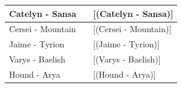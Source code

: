 \documentclass[10pt,a4paper]{article}
\begin{document}
\begin{enumerate}
\begin{table}[H]
\begin{tabular}{|l|l|l|}
		Catelyn - Sansa   &       & {[}(Catelyn - Sansa){]}                                                                                                                                                                                                                                                                                                                                                                                                                                                                              \\ \hline
		Cersei - Mountain &       & {[}(Cersei - Mountain){]}                                                                                                                                                                                                                                                                                                                                                                                                                                                                            \\ \hline
		Jaime - Tyrion    &       & {[}(Jaime - Tyrion){]}                                                                                                                                                                                                                                                                                                                                                                                                                                                                               \\ \hline
		Varys - Baelish   &       & {[}(Varys - Baelish){]}                                                                                                                                                                                                                                                                                                                                                                                                                                                                              \\ \hline
		Hound - Arya      &       & {[}(Hound - Arya){]}                                                                                                                                                                                                                                                                                                                                                                                                                                                                                 \\ \hline

\end{tabular}
\end{table}
\end{enumerate}
\end{document}
